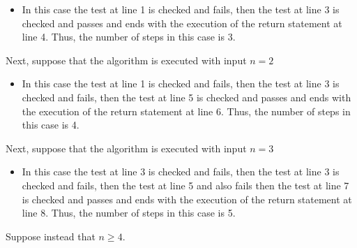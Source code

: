 \documentclass[12pt]{article}
\begin{document}
\begin{itemize}
    \item In this case the test at line 1 is checked and fails, then the test at line 3 is checked 
    and passes and ends with the execution of the return statement at line 4. Thus, the number of
    steps in this case is 3.
\end{itemize}

\noindent Next, suppose that the algorithm is executed with input $n=2$\\

\begin{itemize}
    \item In this case the test at line 1 is checked and fails, then the test at line 3 is checked 
    and fails, then the test at line 5 is checked and passes and ends with the execution of the 
    return statement at line 6. Thus, the number of steps in this case is 4.
\end{itemize}

\noindent Next, suppose that the algorithm is executed with input $n=3$\\

\begin{itemize}
    \item In this case the test at line 3 is checked and fails, then the test at line 3 is checked 
    and fails, then the test at line 5 and also fails then the test at line 7 is checked and passes
    and ends with the execution of the return statement at line 8. Thus, the number of steps in 
    this case is 5.
\end{itemize}

\noindent Suppose instead that $n \geq 4$. 
\end{document}
